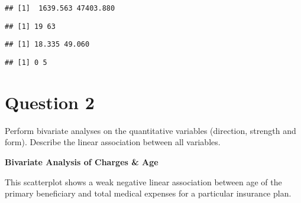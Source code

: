 \documentclass[
]{article}
\newenvironment{Shaded}{\begin{snugshade}}{\end{snugshade}}
\newcommand{\AttributeTok}[1]{\textcolor[rgb]{0.77,0.63,0.00}{#1}}
\newcommand{\ConstantTok}[1]{\textcolor[rgb]{0.00,0.00,0.00}{#1}}
\newcommand{\FunctionTok}[1]{\textcolor[rgb]{0.00,0.00,0.00}{#1}}
\newcommand{\NormalTok}[1]{#1}
\newcommand{\SpecialCharTok}[1]{\textcolor[rgb]{0.00,0.00,0.00}{#1}}
\begin{document}
\begin{verbatim}
## [1]  1639.563 47403.880
\end{verbatim}

\begin{Shaded}
\end{Shaded}

\begin{verbatim}
## [1] 19 63
\end{verbatim}

\begin{Shaded}
\end{Shaded}

\begin{verbatim}
## [1] 18.335 49.060
\end{verbatim}

\begin{Shaded}
\end{Shaded}

\begin{verbatim}
## [1] 0 5
\end{verbatim}

\hypertarget{question-2}{%
\section{Question 2}\label{question-2}}

Perform bivariate analyses on the quantitative variables (direction,
strength and form). Describe the linear association between all
variables.

\textbf{Bivariate Analysis of Charges \& Age}

This scatterplot shows a weak negative linear association between age of
the primary beneficiary and total medical expenses for a particular
insurance plan.
\end{document}

